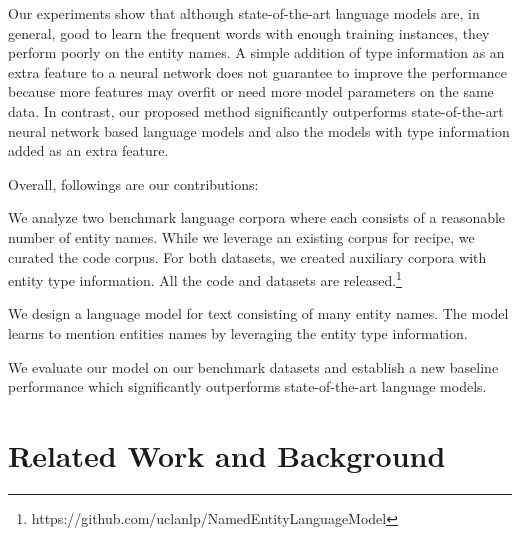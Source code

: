 \documentclass[11pt,a4paper]{article}
\begin{document}
Our experiments show that although state-of-the-art language models are, in general, good to learn the frequent words with enough training instances, they perform poorly on the entity names. A simple addition of type information as an extra feature to a neural network does not guarantee to improve the performance because more features may overfit or need more model parameters on the same data. In contrast, our proposed method significantly outperforms state-of-the-art neural network based language models and also the models with type information added as an extra feature. 

Overall, followings are our contributions:


\begin{compactitem}
\item We analyze two benchmark language corpora where each consists of a reasonable number of entity names. While we leverage an existing  corpus for recipe, we curated the code corpus. For both datasets, we created auxiliary corpora with entity type information. All the code and datasets are released.\footnote{https://github.com/uclanlp/NamedEntityLanguageModel}


     \item We design a language model for text consisting of many entity names. The model learns to mention entities names by leveraging the entity type information.  
     
     \item We evaluate our model on our benchmark datasets and establish a new baseline performance which significantly outperforms  state-of-the-art language models.
     
\end{compactitem}

\section{Related Work and Background}
\label{related}
\end{document}
